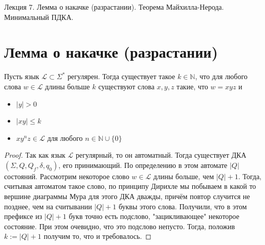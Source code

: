 \documentclass[11pt]{article}
\begin{document}
\begin{titlepage}
    \centering
    \vspace*{\fill}  %

    {\Huge Лекция 7. Лемма о накачке (разрастании). Теорема Майхилла-Нерода. Минимальный ПДКА.
    \par}

    \vspace*{\fill}  %
\end{titlepage}

\setcounter{page}{1}

\section{Лемма о накачке (разрастании)}

\begin{lemma}
    Пусть язык $\mathcal{L} \subset \Sigma^{\ast}$ регулярен. Тогда существует такое $k \in \mathbb{N}$, что для любого слова $w \in \mathcal{L}$ длины больше $k$ существуют слова $x, y, z$ такие, что $w = xyz$ и
    \begin{itemize}
        \item $\left\lvert y \right\rvert > 0$
        \item $\left\lvert xy \right\rvert \leq k$
        \item $xy^nz \in \mathcal{L}$ для любого $n \in \mathbb{N} \cup \{0\}$
    \end{itemize}
\end{lemma}

\begin{proof}
    Так как язык $\mathcal{L}$ регулярный, то он автоматный. Тогда существует ДКА $(\Sigma, Q, Q_f, \delta, q_0)$, его принимающий. По определению в этом автомате $\left\lvert Q \right\rvert$ состояний. Рассмотрим некоторое слово $w \in \mathcal{L}$ длины больше, чем $\left\lvert Q \right\rvert + 1$. Тогда, считывая автоматом такое слово, по принципу Дирихле мы побываем в какой то вершине диаграммы Мура для этого ДКА дважды, причём повтор случится не позднее, чем на считывании $\left\lvert Q \right\rvert + 1$ буквы этого слова. Получили, что в этом префиксе из $\left\lvert Q \right\rvert + 1$ букв точно есть подслово, "зацикливающее" \; некоторое состояние. При этом очевидно, что это подслово непусто. Тогда, положив $k := \left\lvert Q \right\rvert + 1$ получим то, что и требовалось.
\end{proof}
\end{document}

